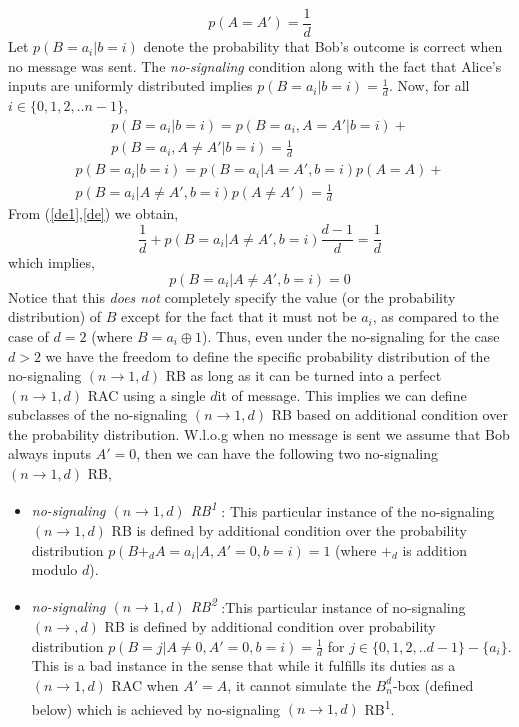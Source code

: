 \documentclass[%
 reprint,
 amsmath,amssymb,
 aps,
]{revtex4-1}
\begin{document}
\begin{equation}\label{de}
p(A=A')=\frac{1}{d}
\end{equation}
Let $p(B=a_i|b=i)$ denote the probability that Bob's outcome is correct when no message was sent. The \textit{no-signaling} condition along with the fact that Alice's inputs are uniformly distributed implies $p(B=a_i|b=i)=\frac{1}{d}$. Now, for all $i\in\{0,1,2,..n-1\}$, 
\begin{multline}
p(B=a_i|b=i)=p(B=a_i,A=A'|b=i)+ \\ p(B=a_i,A\neq A'|b=i)=\frac{1}{d}
\end{multline}
\begin{multline}
p(B=a_i|b=i)=p(B=a_i|A=A',b=i)p(A=A)+ \\ p(B=a_i|A\neq A',b=i)p(A\neq A')=\frac{1}{d}
\end{multline}
From (\ref{de1},\ref{de}) we obtain, 
\begin{equation}
\frac{1}{d}+p(B=a_i|A\neq A',b=i)\frac{d-1}{d}=\frac{1}{d}
\end{equation}
which implies, 
\begin{equation}\label{imp}
p(B=a_i|A\neq A',b=i)=0
\end{equation}
Notice that this \textit{does not} completely specify the value (or the probability distribution) of $B$ except for the fact that it must not be $a_i$, as compared to the case of $d=2$ (where $B=a_i\oplus 1$). Thus, even under the no-signaling for the case $d>2$ we have the freedom to define the specific probability distribution of the no-signaling $(n\rightarrow 1,d)$ RB as long as it can be turned into a perfect $(n\rightarrow 1,d)$ RAC using a single $d$it of message. This implies we can define subclasses of the no-signaling $(n\rightarrow 1,d)$ RB based on additional condition over the probability distribution. W.l.o.g when no message is sent we assume that Bob always inputs $A'=0$, then we can have the following two no-signaling $(n\rightarrow 1,d)$ RB,
\begin{itemize}
\item \textit{no-signaling $(n\rightarrow 1,d)$ RB\textsuperscript{1}} : This particular instance of the no-signaling $(n\rightarrow1,d)$ RB is defined by additional condition over the probability distribution $p(B+_d A=a_i|A,A'=0,b=i)=1$  (where $+_d$  is addition modulo $d$).
\item \textit{no-signaling $(n\rightarrow 1,d)$ RB\textsuperscript{2}} :This particular instance of no-signaling $(n\rightarrow,d)$ RB is defined by additional condition over probability distribution $p(B=j|A\neq0,A'=0,b=i)=\frac{1}{d}$ for $j\in\{0,1,2,..d-1\}-\{a_i\}$. This is a bad instance in the sense that while it fulfills its duties as a $(n\rightarrow 1,d)$ RAC when $A'=A$, it cannot simulate the $B_n^d$-box (defined below) which is achieved by no-signaling $(n\rightarrow 1,d)$ RB\textsuperscript{1}. 
\end{itemize}
\end{document}
